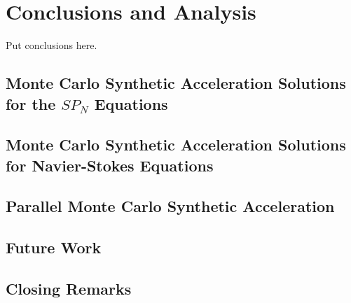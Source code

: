 \chapter{Conclusions and Analysis\ }
\label{ch:conclusion}
Put conclusions here.

\section{Monte Carlo Synthetic Acceleration Solutions for the $SP_N$ Equations\ }
\label{sec:spn_conclusion}

\section{Monte Carlo Synthetic Acceleration Solutions for Navier-Stokes Equations\ }
\label{sec:nonlinear_conclusions}

\section{Parallel Monte Carlo Synthetic Acceleration\ }
\label{sec:parallel_mc_conclusions}

\section{Future Work\ }
\label{sec:future_work}

\section{Closing Remarks\ }
\label{sec:closing}
